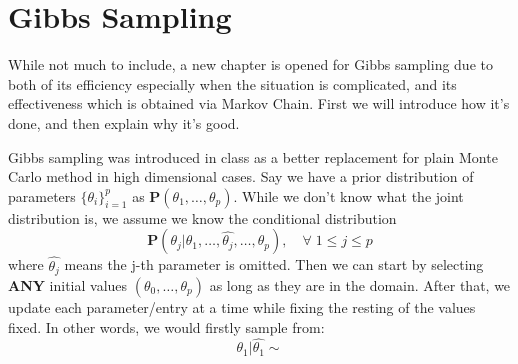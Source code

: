 \chapter{Gibbs Sampling}

While not much to include, a new chapter is opened for Gibbs sampling due to both of its efficiency especially when the situation is complicated, and its effectiveness which is obtained via Markov Chain. First we will introduce how it's done, and then explain why it's good. 

Gibbs sampling was introduced in class as a better replacement for plain Monte Carlo method in high dimensional cases. Say we have a prior distribution of parameters $\{ \theta_i \}_{i=1}^p$ as $\mathbf{P}(\theta_1, \ldots, \theta_p)$. While we don't know what the joint distribution is, we assume we know the conditional distribution 
\begin{equation*}
    \mathbf{P}(\theta_j | \theta_1, \ldots, \hat{\theta_j}, \ldots, \theta_p),\quad \forall \; 1\leq j \leq p
\end{equation*}
where $\hat{\theta_j}$ means the j-th parameter is omitted. Then we can start by selecting \textbf{ANY} initial values $(\theta_0, \ldots, \theta_p)$ as long as they are in the domain. After that, we update each parameter/entry at a time while fixing the resting of the values fixed. In other words, we would firstly sample from:
\begin{equation*}
    \theta_1 | \hat{\theta_1} \sim 
\end{equation*}